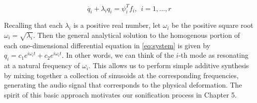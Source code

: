 \begin{equation}
\label{eq:system}
\ddot{q_i} + \lambda_i q_i = \psi_i^{T} f_i, \ \ i = 1, \dots, r
\end{equation}

Recalling that each $\lambda_i$ is a positive real number, let $\omega_i$ be the positive square root $\omega_i = \sqrt{\lambda_i}$. Then the general analytical solution to the homogenous portion of each one-dimensional differential equation in \ref{eq:system} is given by $q_i = c_1 e^{i \omega_i t} + c_2 e^{i \omega_i t}$. In other words, we can think of the $i$-th mode as resonating at a natural frequency of $\omega_i$. This allows us to perform simple additive synthesis by mixing together a collection of sinusoids at the corresponding frequencies, generating the audio signal that corresponds to the physical deformation. The spirit of this basic approach motivates
our sonification process in Chapter 5.
